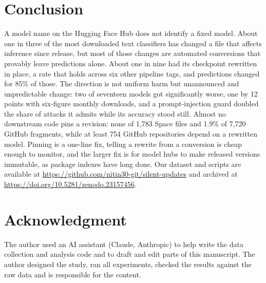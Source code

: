 \documentclass[conference]{IEEEtran}
\begin{document}
\section{Conclusion}
A model name on the Hugging Face Hub does not identify a fixed model. About one in three of the most downloaded text classifiers has changed a file that affects inference since release, but most of those changes are automated conversions that provably leave predictions alone. About one in nine had its checkpoint rewritten in place, a rate that holds across six other pipeline tags, and predictions changed for 85\% of those. The direction is not uniform harm but unannounced and unpredictable change: two of seventeen models got significantly worse, one by 12 points with six-figure monthly downloads, and a prompt-injection guard doubled the share of attacks it admits while its accuracy stood still. Almost no downstream code pins a revision: none of 1,783 Space files and 1.9\% of 7,720 GitHub fragments, while at least 754 GitHub repositories depend on a rewritten model. Pinning is a one-line fix, telling a rewrite from a conversion is cheap enough to monitor, and the larger fix is for model hubs to make released versions immutable, as package indexes have long done. Our dataset and scripts are available at \url{https://github.com/nitin30-git/silent-updates} and archived at \url{https://doi.org/10.5281/zenodo.23157456}.

\section*{Acknowledgment}
The author used an AI assistant (Claude, Anthropic) to help write the data collection and analysis code and to draft and edit parts of this manuscript. The author designed the study, ran all experiments, checked the results against the raw data and is responsible for the content.
\end{document}
